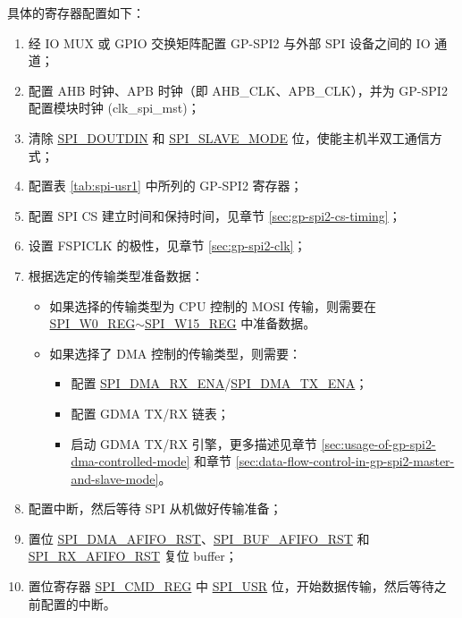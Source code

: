 \documentclass[main\_\_CN.tex]{subfiles}
\begin{document}
具体的寄存器配置如下：
\begin{enumerate}
    \item 经 IO MUX 或 GPIO 交换矩阵配置 GP-SPI2 与外部 SPI 设备之间的 IO 通道； 
    \item 配置 AHB 时钟、APB 时钟（即 AHB\_CLK、APB\_CLK），并为 GP-SPI2 配置模块时钟 (clk\_spi\_mst)；

    \item 清除 \hyperref[fielddesc:SPIDOUTDIN]{SPI\_DOUTDIN} 和 \hyperref[fielddesc:SPISLAVEMODE]{SPI\_SLAVE\_MODE} 位，使能主机半双工通信方式；
    
    \item 配置表 \ref{tab:spi-usr1} 中所列的 GP-SPI2 寄存器；
    
    \item 配置 SPI CS 建立时间和保持时间，见章节  \ref{sec:gp-spi2-cs-timing}；
    
    \item 设置 FSPICLK 的极性，见章节  \ref{sec:gp-spi2-clk}； 
    
    \item 根据选定的传输类型准备数据：
    \begin{itemize}
        \item 如果选择的传输类型为 CPU 控制的 MOSI 传输，则需要在 \hyperref[regdesc:SPIW0REG]{SPI\_W0\_REG}$\sim$\hyperref[regdesc:SPIW15REG]{SPI\_W15\_REG} 中准备数据。 
        
        \item 如果选择了 DMA 控制的传输类型，则需要： 
        \begin{itemize}
            \item 配置 \hyperref[fielddesc:SPIDMARXENA]{SPI\_DMA\_RX\_ENA}/\hyperref[fielddesc:SPIDMATXENA]{SPI\_DMA\_TX\_ENA}；
            \item 配置 GDMA TX/RX 链表；
            \item 启动 GDMA TX/RX 引擎，更多描述见章节 \ref{sec:usage-of-gp-spi2-dma-controlled-mode} 和章节 \ref{sec:data-flow-control-in-gp-spi2-master-and-slave-mode}。
        \end{itemize}
    \end{itemize}
    
    \item 配置中断，然后等待 SPI 从机做好传输准备；
    
    \item 置位 \hyperref[fielddesc:SPIDMAAFIFORST]{SPI\_DMA\_AFIFO\_RST}、\hyperref[fielddesc:SPIBUFAFIFORST]{SPI\_BUF\_AFIFO\_RST} 和 \hyperref[fielddesc:SPIRXAFIFORST]{SPI\_RX\_AFIFO\_RST} 复位 buffer；

    \item 置位寄存器 \hyperref[regdesc:SPICMDREG]{SPI\_CMD\_REG} 中 \hyperref[fielddesc:SPIUSR]{SPI\_USR} 位，开始数据传输，然后等待之前配置的中断。
\end{enumerate}
\end{document}
